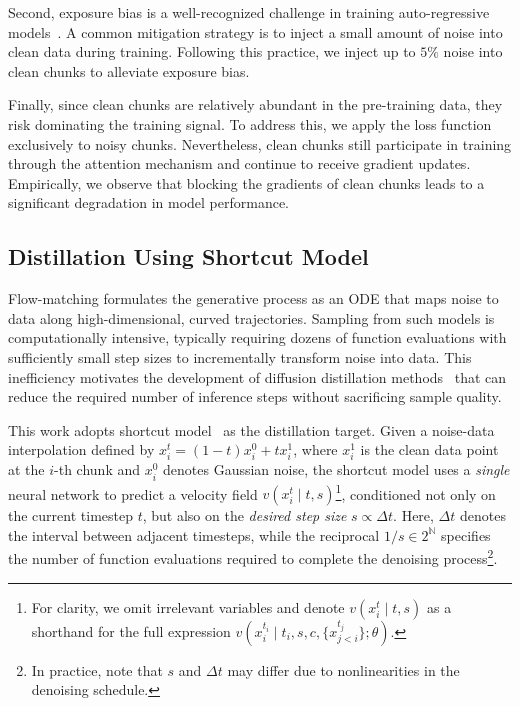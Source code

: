 Second, exposure bias is a well-recognized challenge in training auto-regressive models~\citep{bengio2015scheduled,wiseman2016sequence}. A common mitigation strategy is to inject a small amount of noise into clean data during training. Following this practice, we inject up to $5\%$ noise into clean chunks to alleviate exposure bias.

Finally, since clean chunks are relatively abundant in the pre-training data, they risk dominating the training signal. To address this, we apply the loss function exclusively to noisy chunks. Nevertheless, clean chunks still participate in training through the attention mechanism and continue to receive gradient updates. Empirically, we observe that blocking the gradients of clean chunks leads to a significant degradation in model performance.

\subsection{Distillation Using Shortcut Model}
Flow-matching formulates the generative process as an ODE that maps noise to data along high-dimensional, curved trajectories. Sampling from such models is computationally intensive, typically requiring dozens of function evaluations with sufficiently small step sizes to incrementally transform noise into data. This inefficiency motivates the development of diffusion distillation methods~\citep{luhman2021knowledge, salimans2022progressive} that can reduce the required number of inference steps without sacrificing sample quality.

This work adopts shortcut model~\citep{frans2024one} as the distillation target. Given a noise-data interpolation defined by $x_i^t = (1 - t)x_i^0 + t x_i^1$, where \( x_i^1 \) is the clean data point at the \( i \)-th chunk and \( x_i^0 \) denotes Gaussian noise, the shortcut model uses a \textit{single} neural network to predict a velocity field \( v(x_i^t \mid t, s) \)\footnote{For clarity, we omit irrelevant variables and denote \( v(x_i^t \mid t, s) \) as a shorthand for the full expression \( v(x_i^{t_i} \mid t_i, s, c, \{x_{j<i}^{t_j}\}; \theta) \).}, conditioned not only on the current timestep \( t \), but also on the \textit{desired step size} \( s \propto \Delta t \).
Here, \( \Delta t \) denotes the interval between adjacent timesteps, while the reciprocal \( 1/s \in 2^{\mathbb{N}} \) specifies the number of function evaluations required to complete the denoising process\footnote{In practice, note that \( s \) and \( \Delta t \) may differ due to nonlinearities in the denoising schedule.}.


